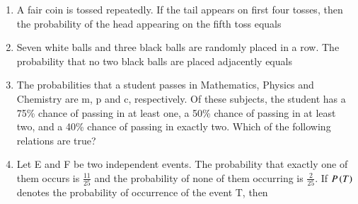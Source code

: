 \documentclass[journal,12pt,onecolumn,article]{IEEEtran}
\theoremstyle{remark}
\begin{document}
\begin{enumerate}[start=3]
\begin{enumerate}
\end{enumerate}
\item A fair coin is tossed repeatedly. If the tail appears on first four tosses, then the probability of the head appearing on the fifth toss equals
\hfill{}
\begin{enumerate}
\end{enumerate}
\item Seven white balls and three black balls are randomly placed in a row. The probability that no two black balls are placed adjacently equals
\hfill{}
\begin{enumerate}
\end{enumerate}
\item The probabilities that a student passes in Mathematics, Physics and Chemistry are m, p and c, respectively. Of these subjects, the student has a 75\% chance of passing in at least one, a 50\% chance of passing in at least two, and a 40\% chance of passing in exactly two. Which of the following relations are true?
\hfill{}
\begin{enumerate}
\end{enumerate}
\item Let E and F be two independent events. The probability that exactly one of them occurs is $\frac{11}{25}$ and the probability of none of them occurring is $\frac{2}{25}$. If $P\left(T\right)$ denotes the probability of occurrence of the event T, then

\end{enumerate}
\end{document}
